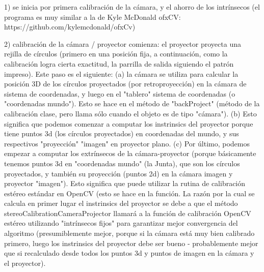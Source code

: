 1) se inicia por primera calibración de la cámara, y el ahorro de los intrínsecos (el programa es muy similar a la de Kyle McDonald ofxCV: https://github.com/kylemcdonald/ofxCv)

2) calibración de la cámara / proyector comienza: el proyector proyecta una rejilla de círculos (primero en una posición fija, a continuación, como la calibración logra cierta exactitud, la parrilla de salida siguiendo el patrón impreso). Este paso es el siguiente: (a) la cámara se utiliza para calcular la posición 3D de los círculos proyectados (por retroproyección) en la cámara de sistema de coordenadas, y luego en el "tablero" sistema de coordenadas (o "coordenadas mundo"). Esto se hace en el método de "backProject" (método de la calibración clase, pero llama sólo cuando el objeto es de tipo "cámara"). (b) Esto significa que podemos comenzar a computar los instrinsics del proyector porque tiene puntos 3d (los círculos proyectados) en coordenadas del mundo, y sus respectivos "proyección" "imagen" en proyector plano. (c) Por último, podemos empezar a computar los extrínsecos de la cámara-proyector (porque básicamente tenemos puntos 3d en "coordenadas mundo" (la Junta), que son los círculos proyectados, y también su proyección (puntos 2d) en la cámara imagen y proyector "imagen"). Esto significa que puede utilizar la rutina de calibración estéreo estándar en OpenCV (esto se hace en la función. La razón por la cual se calcula en primer lugar el instrinsics del proyector se debe a que el método stereoCalibrationCameraProjector llamará a la función de calibración OpenCV estéreo utilizando "intrínsecos fijos" para garantizar mejor convergencia del algoritmo (presumiblemente mejor, porque si la cámara está muy bien calibrado primero, luego los instrinsics del proyector debe ser bueno - probablemente mejor que si recalculado desde todos los puntos 3d y puntos de imagen en la cámara y el proyector).


